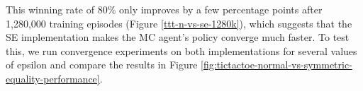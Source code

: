\documentclass[11pt,a4paper,twoside,openright]{report}
\begin{document}
This winning rate of 80\% only improves by a few percentage points after 1,280,000 training episodes (Figure \ref{ttt-n-vs-se-1280k}), which suggests that the SE implementation makes the MC agent's policy converge much faster. To test this, we run convergence experiments on both implementations for several values of epsilon and compare the results in Figure \ref{fig:tictactoe-normal-vs-symmetric-equality-performance}.

\begin{figure}
    \centering


\end{figure}
\end{document}
